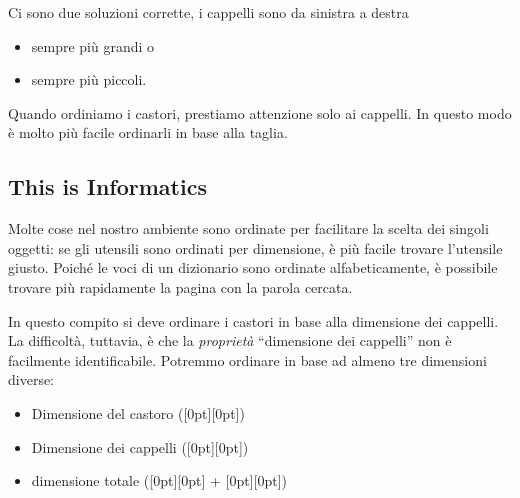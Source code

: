 \documentclass[a4paper,11pt]{report}
\newcommand{\taskGraphicsFolder}{..}
\begin{document}
{\centering%
\raisebox{-0.5ex}{} \raisebox{-0.5ex}{}\par}

Ci sono due soluzioni corrette, i cappelli sono da sinistra a destra

\begin{itemize}
  \item sempre più grandi o
  \item sempre più piccoli.
\end{itemize}

Quando ordiniamo i castori, prestiamo attenzione solo ai cappelli. In questo modo è molto più facile ordinarli in base alla taglia.

{\centering%
\raisebox{-0.5ex}{} \raisebox{-0.5ex}{}\par}


\subsection*{This is Informatics}

Molte cose nel nostro ambiente sono ordinate per facilitare la scelta dei singoli oggetti: se gli utensili sono ordinati per dimensione, è più facile trovare l’utensile giusto. Poiché le voci di un dizionario sono ordinate alfabeticamente, è possibile trovare più rapidamente la pagina con la parola cercata.

In questo compito si deve ordinare i castori in base alla dimensione dei cappelli. La difficoltà, tuttavia, è che la \emph{proprietà} \enquote{dimensione dei cappelli} non è facilmente identificabile. Potremmo ordinare in base ad almeno tre dimensioni diverse:

\begin{itemize}
  \item Dimensione del castoro (\raisebox{-0.5ex}[0pt][0pt]{})
  \item Dimensione dei cappelli (\raisebox{-0.5ex}[0pt][0pt]{})
  \item dimensione totale (\raisebox{-0.5ex}[0pt][0pt]{} + \raisebox{-0.5ex}[0pt][0pt]{})
\end{itemize}
\end{document}
